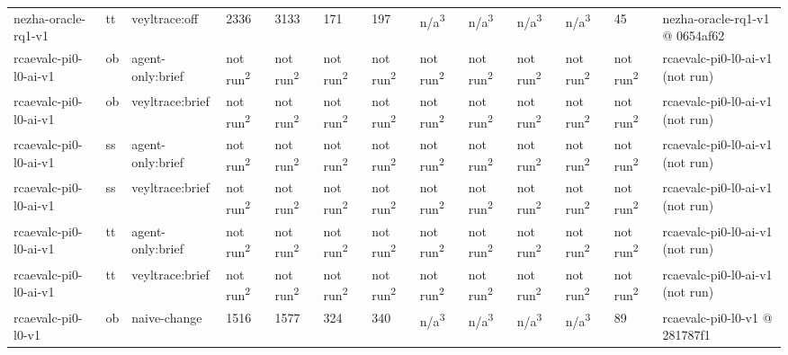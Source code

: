 \begin{table}[t]
\begin{tabular}{lllllllllllll}
nezha-oracle-rq1-v1 & tt & veyltrace:off & 2336 & 3133 & 171 & 197 & n/a\textsuperscript{3} & n/a\textsuperscript{3} & n/a\textsuperscript{3} & n/a\textsuperscript{3} & 45 & nezha-oracle-rq1-v1 @ 0654af62 \\
rcaevalc-pi0-l0-ai-v1 & ob & agent-only:brief & not run\textsuperscript{2} & not run\textsuperscript{2} & not run\textsuperscript{2} & not run\textsuperscript{2} & not run\textsuperscript{2} & not run\textsuperscript{2} & not run\textsuperscript{2} & not run\textsuperscript{2} & not run\textsuperscript{2} & rcaevalc-pi0-l0-ai-v1 (not run) \\
rcaevalc-pi0-l0-ai-v1 & ob & veyltrace:brief & not run\textsuperscript{2} & not run\textsuperscript{2} & not run\textsuperscript{2} & not run\textsuperscript{2} & not run\textsuperscript{2} & not run\textsuperscript{2} & not run\textsuperscript{2} & not run\textsuperscript{2} & not run\textsuperscript{2} & rcaevalc-pi0-l0-ai-v1 (not run) \\
rcaevalc-pi0-l0-ai-v1 & ss & agent-only:brief & not run\textsuperscript{2} & not run\textsuperscript{2} & not run\textsuperscript{2} & not run\textsuperscript{2} & not run\textsuperscript{2} & not run\textsuperscript{2} & not run\textsuperscript{2} & not run\textsuperscript{2} & not run\textsuperscript{2} & rcaevalc-pi0-l0-ai-v1 (not run) \\
rcaevalc-pi0-l0-ai-v1 & ss & veyltrace:brief & not run\textsuperscript{2} & not run\textsuperscript{2} & not run\textsuperscript{2} & not run\textsuperscript{2} & not run\textsuperscript{2} & not run\textsuperscript{2} & not run\textsuperscript{2} & not run\textsuperscript{2} & not run\textsuperscript{2} & rcaevalc-pi0-l0-ai-v1 (not run) \\
rcaevalc-pi0-l0-ai-v1 & tt & agent-only:brief & not run\textsuperscript{2} & not run\textsuperscript{2} & not run\textsuperscript{2} & not run\textsuperscript{2} & not run\textsuperscript{2} & not run\textsuperscript{2} & not run\textsuperscript{2} & not run\textsuperscript{2} & not run\textsuperscript{2} & rcaevalc-pi0-l0-ai-v1 (not run) \\
rcaevalc-pi0-l0-ai-v1 & tt & veyltrace:brief & not run\textsuperscript{2} & not run\textsuperscript{2} & not run\textsuperscript{2} & not run\textsuperscript{2} & not run\textsuperscript{2} & not run\textsuperscript{2} & not run\textsuperscript{2} & not run\textsuperscript{2} & not run\textsuperscript{2} & rcaevalc-pi0-l0-ai-v1 (not run) \\
rcaevalc-pi0-l0-v1 & ob & naive-change & 1516 & 1577 & 324 & 340 & n/a\textsuperscript{3} & n/a\textsuperscript{3} & n/a\textsuperscript{3} & n/a\textsuperscript{3} & 89 & rcaevalc-pi0-l0-v1 @ 281787f1 \\

\end{tabular}
\end{table}
